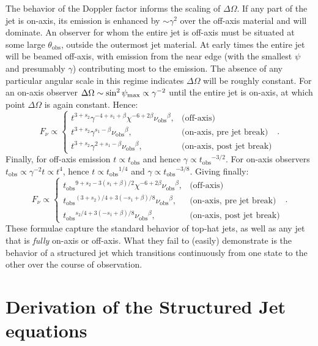 \documentclass[twocolumn]{aastex62}
\newcommand{\tobs}{\ensuremath{t_{\mathrm{obs}}}}
\newcommand{\nuobs}{\ensuremath{\nu_{\mathrm{obs}}}}
\newcommand{\thobs}{\ensuremath{\theta_{\mathrm{obs}}}}
\begin{document}
The behavior of the Doppler factor informs the scaling of $\Delta \Omega$.  If any part of the jet is on-axis, its emission is enhanced by $\sim \gamma^2$ over the off-axis material and will dominate.  An observer for whom the entire jet is off-axis must be situated at some large $\thobs$, outside the outermost jet material.  At early times the entire jet will be beamed off-axis, with emission from the near edge (with the smallest $\psi$ and presumably $\gamma$) contributing most to the emission.  The absence of any particular angular scale in this regime indicates $\Delta \Omega$ will be roughly constant.  For an on-axis observer $\Delta \Omega \sim \sin^2 \psi_{\rm{max}} \propto \gamma^{-2}$ until the entire jet is on-axis, at which point $\Delta \Omega$ is again constant.  Hence:
\begin{equation}
	F_\nu \propto \left \{ \begin{matrix}
				t^{3+s_2} \gamma^{-4+s_1+\beta} \chi^{-6+2\beta}\nuobs^\beta,  & \text{(off-axis)} \\
				t^{3+s_2} \gamma^{s_1-\beta} \nuobs^\beta, &  \text{(on-axis, pre jet break)} \\
				t^{3+s_2} \gamma^{2+s_1-\beta} \nuobs^\beta, & \text{(on-axis, post jet break)} \end{matrix} \right . \ .
\end{equation}
Finally, for off-axis emission $t \propto \tobs$ and hence $\gamma \propto \tobs^{-3/2}$.  For on-axis observers $\tobs \propto \gamma^{-2} t \propto t^4$, hence $t\propto \tobs^{1/4}$ and $\gamma \propto \tobs^{-3/8}$. Giving finally:
\begin{equation}
	F_\nu \propto \left \{ \begin{matrix}
				\tobs^{9+s_2 -3(s_1+\beta)/2} \chi^{-6+2\beta}\nuobs^\beta,  & \text{(off-axis)} \\
				\tobs^{(3+s_2)/4+3(-s_1+\beta)/8} \nuobs^\beta, &\text{(on-axis, pre jet break)} \\
				\tobs^{s_2/4 + 3(-s_1+\beta)/8} \nuobs^\beta, & \text{(on-axis, post jet break)} \end{matrix} \right . \ .
\end{equation}
These formulae capture the standard behavior of top-hat jets, as well as any jet that is \emph{fully} on-axis or off-axis.  What they fail to (easily) demonstrate is the behavior of a structured jet which transitions continuously from one state to the other over the course of observation.

\section{Derivation of the Structured Jet equations}\label{app:derive2}
\end{document}
